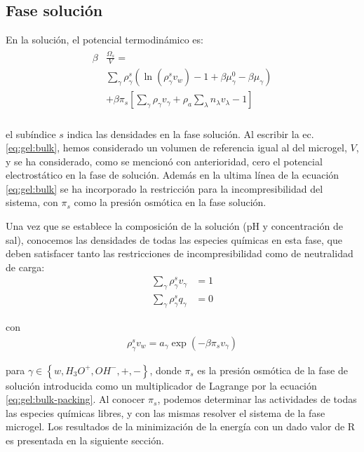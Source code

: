 \subsection{Fase soluci\'on}\label{sec:gel:fase-solucion}

En la soluci\'on, el potencial termodin\'amico es:
%
%
\begin{align}
\begin{aligned}
\beta&\frac{\Omega_s}{V}=\\& \sum_{\gamma   } {\rho^s_\gamma\left(\ln(\rho_\gamma^sv_w) -1 + \beta\mu_\gamma^0 - \beta\mu_\gamma\right)} \\
& +\beta\pi_{s} \left[ \sum_{\gamma } \rho_\gamma v_\gamma + \rho_a \sum_\lambda n_\lambda v_\lambda -1 \right] \\
\end{aligned}
\label{eq:gel:bulk}
\end{align}

\noindent el sub\'indice  $s$  indica las densidades en la fase soluci\'on.
Al escribir la ec. \ref{eq:gel:bulk}, hemos considerado un volumen de referencia igual al del microgel, $V$, y se ha considerado, como se mencion\'o con anterioridad, cero el potencial electrost\'atico en la fase de soluci\'on.
Adem\'as en la ultima l\'inea de la ecuaci\'on \ref{eq:gel:bulk} se ha incorporado la restricci\'on para la incompresibilidad del sistema, con $\pi_s$ como la presi\'on osm\'otica en la fase soluci\'on.

Una vez que se establece la composici\'on de la soluci\'on (pH y concentraci\'on de sal), conocemos las densidades de todas las especies qu\'imicas en esta fase, que deben satisfacer tanto las restricciones de incompresibilidad como de neutralidad de carga:
%
%
\begin{align}
\sum_{\gamma  } \rho_\gamma^s v_\gamma  &=1\label{eq:gel:bulk-packing}\\
\sum_{\gamma  } \rho_\gamma^s q_\gamma  &=0
\end{align}

\noindent con
%
%
\begin{align}
\rho_\gamma^s v_w= a_\gamma \exp(-\beta\pi_s v_\gamma)
\label{eq:gel:bulk-electroneutrality}
\end{align}



\noindent para $\gamma \in \left\{ w, H_3O^+, OH^-, +,- \right\}$, donde $\pi_s$ es la presi\'on osm\'otica de la fase de soluci\'on introducida como un multiplicador de Lagrange por la ecuaci\'on \ref{eq:gel:bulk-packing}.
Al conocer $\pi_s$, podemos determinar las actividades de todas las especies qu\'imicas libres, y con las mismas resolver el sistema de la fase microgel.
Los resultados de la minimizaci\'on de la energ\'ia con un dado valor de R es presentada en la siguiente secci\'on.

